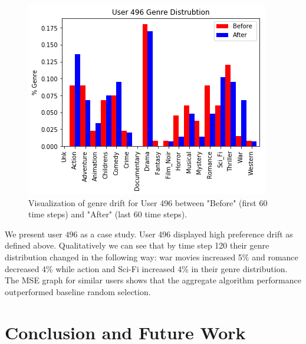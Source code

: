 \documentclass{article}
\begin{document}
\begin{figure}[ht]

\begin{center}
\centerline{\includegraphics[width=\columnwidth]{drift_histogram}}
\caption{Visualization of genre drift for User 496 between "Before" (first 60 time steps) and "After" (last 60 time steps).}
\label{drift_histogram}
\end{center}

\vskip -0.2in
\end{figure}

We present user $496$ as a case study. User 496 displayed high preference drift as defined above. Qualitatively we can see that by time step 120 their genre distribution changed in the following way: war movies increased 5\% and romance decreased 4\% while action and Sci-Fi increased 4\% in their genre distribution. The MSE graph for similar users shows that the aggregate algorithm performance outperformed baseline random selection.  

\section{Conclusion and Future Work}

\nocite{kawale2015efficient}
\nocite{wang2017online}
\nocite{zhao2013interactive}
\nocite{cherkassky2013sequential}
\nocite{arulampalam2002tutorial}
\nocite{douc2005comparison}
\nocite{doucet2009tutorial}
\nocite{orhan2012particle}
\nocite{lo2017temporal}
\nocite{lindsten2015rao}



\end{document}
